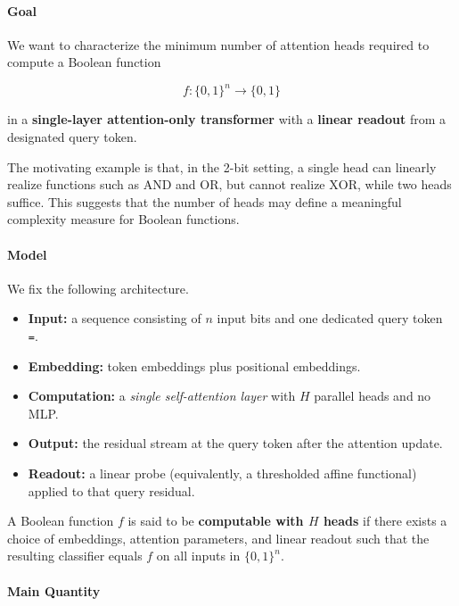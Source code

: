 \documentclass{article}
\theoremstyle{definition}
\theoremstyle{plain}
\begin{document}
\begin{sourcebox}
\paragraph{Goal}

We want to characterize the minimum number of attention heads required to compute a Boolean function

\[f : \lbrace 0,1 \rbrace^n \to \lbrace 0,1 \rbrace\]

in a \textbf{single-layer attention-only transformer} with a \textbf{linear readout} from a designated query token.

The motivating example is that, in the 2-bit setting, a single head can linearly realize functions such as $\mathrm{AND}$ and $\mathrm{OR}$, but cannot realize $\mathrm{XOR}$, while two heads suffice. This suggests that the number of heads may define a meaningful complexity measure for Boolean functions.

\paragraph{Model}

We fix the following architecture.

\begin{itemize}[leftmargin=*,nosep]
  \item \textbf{Input:} a sequence consisting of $n$ input bits and one dedicated query token \texttt{=}.
  \item \textbf{Embedding:} token embeddings plus positional embeddings.
  \item \textbf{Computation:} a \emph{single self-attention layer} with $H$ parallel heads and no MLP.
  \item \textbf{Output:} the residual stream at the query token after the attention update.
  \item \textbf{Readout:} a linear probe (equivalently, a thresholded affine functional) applied to that query residual.
\end{itemize}

A Boolean function $f$ is said to be \textbf{computable with $H$ heads} if there exists a choice of embeddings, attention parameters, and linear readout such that the resulting classifier equals $f$ on all inputs in $\lbrace 0,1 \rbrace^n$.

\paragraph{Main Quantity}


\end{sourcebox}
\end{document}
